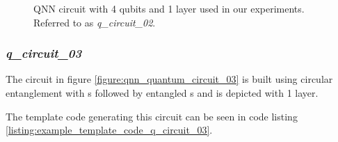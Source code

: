 \begin{figure}[!h]
	\centering
	\caption{QNN circuit with 4 qubits and 1 layer used in our experiments. Referred to as \textit{q\_circuit\_02}.}
	\label{figure:qnn_quantum_circuit_02}
\end{figure}


\subsubsection{\textit{q\_circuit\_03}}
\label{subsubsection:qnn_quantum_circuit_03}
The circuit in figure \ref{figure:qnn_quantum_circuit_03} is built using circular entanglement with \rygate s followed by entangled \czgate s and is depicted with 1 layer.

The template code generating this circuit can be seen in code listing \ref{listing:example_template_code_q_circuit_03}.

